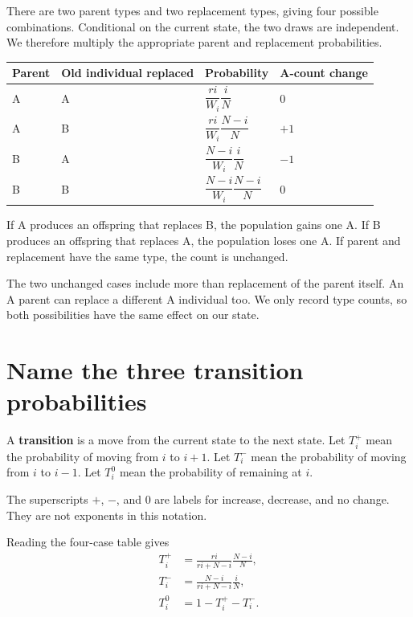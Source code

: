 There are two parent types and two replacement types, giving four possible
combinations. Conditional on the current state, the two draws are independent.
We therefore multiply the appropriate parent and replacement probabilities.

\begin{center}
\begin{tabular}{llll}
\hline
Parent & Old individual replaced & Probability & A-count change \\
\hline
A & A & \(\dfrac{ri}{W_i}\dfrac{i}{N}\) & \(0\) \\[6pt]
A & B & \(\dfrac{ri}{W_i}\dfrac{N-i}{N}\) & \(+1\) \\[6pt]
B & A & \(\dfrac{N-i}{W_i}\dfrac{i}{N}\) & \(-1\) \\[6pt]
B & B & \(\dfrac{N-i}{W_i}\dfrac{N-i}{N}\) & \(0\) \\[6pt]
\hline
\end{tabular}
\end{center}

If A produces an offspring that replaces B, the population gains one A.
If B produces an offspring that replaces A, the population loses one A.
If parent and replacement have the same type, the count is unchanged.

The two unchanged cases include more than replacement of the parent itself.
An A parent can replace a different A individual too. We only record type
counts, so both possibilities have the same effect on our state.

\section{Name the three transition probabilities}

A \textbf{transition} is a move from the current state to the next state.
Let \(T_i^+\) mean the probability of moving from \(i\) to \(i+1\).
Let \(T_i^-\) mean the probability of moving from \(i\) to \(i-1\).
Let \(T_i^0\) mean the probability of remaining at \(i\).

The superscripts \(+\), \(-\), and \(0\) are labels for increase,
decrease, and no change. They are not exponents in this notation.

Reading the four-case table gives
\begin{align}
 T_i^+&=\frac{ri}{ri+N-i}\frac{N-i}{N},\label{eq:t-plus}\\
 T_i^-&=\frac{N-i}{ri+N-i}\frac{i}{N},\label{eq:t-minus}\\
 T_i^0&=1-T_i^+-T_i^-.
 \label{eq:t-stay}
\end{align}

